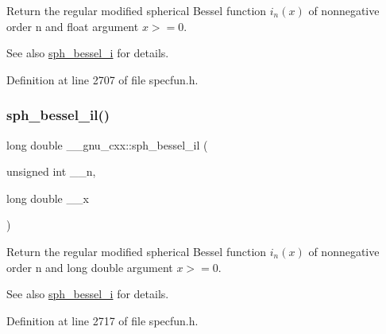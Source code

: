Return the regular modified spherical Bessel function $ i_n(x) $ of nonnegative order n and {\ttfamily float} argument $ x >= 0 $.

\begin{DoxySeeAlso}{See also}
\hyperlink{group__gnu__math__spec__func_ga156b8154b27b7898c8b2abf4284f7323}{sph\+\_\+bessel\+\_\+i} for details. 
\end{DoxySeeAlso}


Definition at line 2707 of file specfun.\+h.

\mbox{\label{group__gnu__math__spec__func_gaf4392d9ed177913febdcbfccb947dbca}} 
\subsubsection{\texorpdfstring{sph\+\_\+bessel\+\_\+il()}{sph\_bessel\_il()}}
{\footnotesize\ttfamily long double \+\_\+\+\_\+gnu\+\_\+cxx\+::sph\+\_\+bessel\+\_\+il (\begin{DoxyParamCaption}\item[{unsigned int}]{\+\_\+\+\_\+n,  }\item[{long double}]{\+\_\+\+\_\+x }\end{DoxyParamCaption})\hspace{0.3cm}{\ttfamily [inline]}}

Return the regular modified spherical Bessel function $ i_n(x) $ of nonnegative order n and {\ttfamily long double} argument $ x >= 0 $.

\begin{DoxySeeAlso}{See also}
\hyperlink{group__gnu__math__spec__func_ga156b8154b27b7898c8b2abf4284f7323}{sph\+\_\+bessel\+\_\+i} for details. 
\end{DoxySeeAlso}


Definition at line 2717 of file specfun.\+h.

\mbox{\label{group__gnu__math__spec__func_ga288b28f2c6995d052a4f5f17293cbf1a}} 
